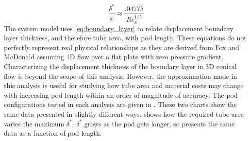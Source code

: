 \begin{equation}
	\label{eq:boundary_layer}
	\frac{\delta^{*}}{x} \approx  \frac{.04775}{Re_{x}^{1/5}}
\end{equation}
The system model uses \cref{eq:boundary_layer} to relate displacement boundary layer thickness,
and therefore tube area, with pod length. These equations
do not perfectly represent real physical relationships as they are derived from
Fox and McDonald assuming 1D flow over a
flat plate with zero pressure gradient. Characterizing the displacement
thickness of the boundary layer in 3D conical flow is beyond the scope of this analysis.
However, the approximation made in this analysis is useful for studying how
tube area and material costs may change with increasing pod length within an
order of magnitude of accuracy.  The pod configurations tested in each analysis are given in
. These two charts show the same data presented in
slightly different ways. 
shows how the required tube area varies the maximum $\delta^*$. $\delta^*$
grows as the pod gets longer, so  presents the
same data as a function of pod length.

